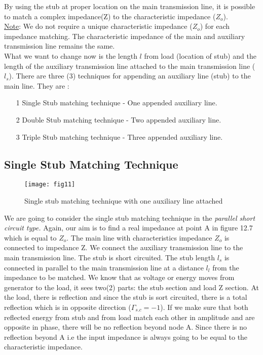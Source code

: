 By using the stub at proper location on the main transmission line, it is possible to match a complex impedance(Z) to the characteristic impedance ($Z_o$).\\
\underline{Note}: We do not require a unique characteristic impedance ($Z_o$) for each impedance matching. The characteristic impedance of the main and auxiliary transmission line remains the same.\\

What we want to change now is the length $l$ from load (location of stub) and the length of the auxiliary transmission line attached to the main transmission line ($l_s$). There are three (3) techniques for appending an auxiliary line (stub) to the main line. They are :
\begin{itemize}
	\item[1] Single Stub matching technique - One appended auxiliary line.
	\item[2]Double Stub matching technique - Two appended auxiliary line.
	\item[3]Triple Stub matching technique - Three appended auxiliary line.  
\end{itemize} 
\subsection{Single Stub Matching Technique }%
 \begin{figure}[h]
	\centering
	\texttt{[image: fig11]}
	\caption{Single stub matching technique with one auxiliary line attached}
\end{figure}

 We are going to consider the single stub matching technique in the\textit{ parallel short circuit type.} Again, our aim is to find a real impedance at point A in figure 12.7 which is equal to $Z_o$. The main line with characteristics impedance $ Z_o$ is connected to impedance Z. We connect the auxiliary transmission line to the main transmission line. The stub is short circuited. The stub length $l_s$ is connected in parallel to the main transmission line at a distance $ l_l$ from the impedance to be matched. We know that as voltage or energy moves from generator to the load, it sees two(2) parts: the stub section and load Z section. At the load, there is  reflection and since the stub is sort circuited, there is a total reflection which is in opposite direction ($\Gamma_{s.c} = -1$). If we make sure that both reflected energy from stub and  from load match each other in amplitude and are opposite in phase, there will be no reflection beyond node A. Since there is no reflection beyond A i.e the input impedance is always going to be equal to the characteristic impedance.\\

